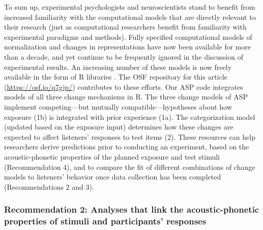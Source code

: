 \documentclass[
  11pt,
  man,floatsintext]{apa6}
\begin{document}
To sum up, experimental psychologists and neuroscientists stand to benefit from increased familiarity with the computational models that are directly relevant to their research (just as computational researchers benefit from familiarity with experimental paradigms and methods). Fully specified computational models of normalization and changes in representations have now been available for more than a decade, and yet continue to be frequently ignored in the discussion of experimental results. An increasing number of these models is now freely available in the form of R libraries \autocites[e.g., for normalization: \texttt{phonTools},][]{barreda2015}[for changes in category representations: \texttt{beliefupdatr} and its extension \texttt{MVBeliefUpdatr},][]{kleinschmidt-jaeger2015}. The OSF repository for this article (\url{https://osf.io/q7gjp/}) contributes to these efforts. Our ASP code integrates models of all three change mechanisms in R. The three change models of ASP implement competing---but mutually compatible---hypotheses about how exposure (1b) is integrated with prior experience (1a). The categorization model (updated based on the exposure input) determines how these changes are expected to affect listeners' responses to test items (2). These resources can help researchers derive predictions prior to conducting an experiment, based on the acoustic-phonetic properties of the planned exposure and test stimuli (Recommendation 4), and to compare the fit of different combinations of change models to listeners' behavior once data collection has been completed (Recommendations 2 and 3).

\subsubsection{Recommendation 2: Analyses that link the acoustic-phonetic properties of stimuli and participants' responses}\label{recommendation-2-analyses-that-link-the-acoustic-phonetic-properties-of-stimuli-and-participants-responses}
\end{document}

